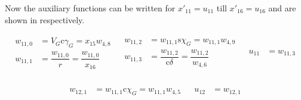 \noindent
Now the auxiliary functions can be written for $x'_{11} = u_{11}$ till $x'_{16} = u_{16}$ and are shown in  respectively. 

\begin{align} \label{eq:auxF11}
\begin{split}
w_{11,0} &= V_{G}\text{c}\gamma_{G} = x_{15}w_{4,8} \\
w_{11,1} &= \dfrac{w_{11,0}}{r} = \dfrac{w_{11,0}}{x_{16}} \\
\end{split}
&
\begin{split}
w_{11,2} &= w_{11,1}\text{s}\chi_{G} = w_{11,1}w_{4,9} \\
w_{11,3} &= \dfrac{w_{11,2}}{\text{c}\delta} = \dfrac{w_{11,2}}{w_{4,6}} \\
\end{split}
&
\begin{split}
u_{11} &= w_{11,3} \\
\end{split}
\end{align}

\begin{align} \label{eq:auxF12}
\begin{split}
w_{12,1} &= w_{11,1}\text{c}\chi_{G} = w_{11,1}w_{4,5} \\
\end{split}
&
\begin{split}
u_{12} &= w_{12,1} \\
\end{split}
\end{align}

